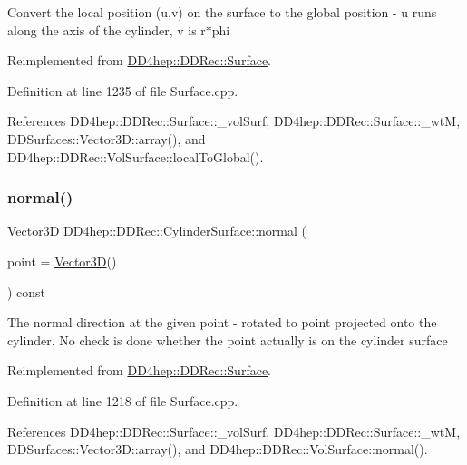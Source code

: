 Convert the local position (u,v) on the surface to the global position -\/ u runs along the axis of the cylinder, v is r$\ast$phi 

Reimplemented from \hyperlink{class_d_d4hep_1_1_d_d_rec_1_1_surface_a766587a97ca4b6c7ef4d2f72b967379c}{D\+D4hep\+::\+D\+D\+Rec\+::\+Surface}.



Definition at line 1235 of file Surface.\+cpp.



References D\+D4hep\+::\+D\+D\+Rec\+::\+Surface\+::\+\_\+vol\+Surf, D\+D4hep\+::\+D\+D\+Rec\+::\+Surface\+::\+\_\+wtM, D\+D\+Surfaces\+::\+Vector3\+D\+::array(), and D\+D4hep\+::\+D\+D\+Rec\+::\+Vol\+Surface\+::local\+To\+Global().

\hypertarget{class_d_d4hep_1_1_d_d_rec_1_1_cylinder_surface_aa995b70c3bfeaa1a21c61b917e4507c5}{}\label{class_d_d4hep_1_1_d_d_rec_1_1_cylinder_surface_aa995b70c3bfeaa1a21c61b917e4507c5} 
\subsubsection{\texorpdfstring{normal()}{normal()}}
{\footnotesize\ttfamily \hyperlink{class_d_d_surfaces_1_1_vector3_d}{Vector3D} D\+D4hep\+::\+D\+D\+Rec\+::\+Cylinder\+Surface\+::normal (\begin{DoxyParamCaption}\item[{const \hyperlink{class_d_d_surfaces_1_1_vector3_d}{Vector3D} \&}]{point = {\ttfamily \hyperlink{class_d_d_surfaces_1_1_vector3_d}{Vector3D}()} }\end{DoxyParamCaption}) const\hspace{0.3cm}{\ttfamily [virtual]}}

The normal direction at the given point -\/ rotated to point projected onto the cylinder. No check is done whether the point actually is on the cylinder surface 

Reimplemented from \hyperlink{class_d_d4hep_1_1_d_d_rec_1_1_surface_a39933172300e705018ff3b3a0de450a3}{D\+D4hep\+::\+D\+D\+Rec\+::\+Surface}.



Definition at line 1218 of file Surface.\+cpp.



References D\+D4hep\+::\+D\+D\+Rec\+::\+Surface\+::\+\_\+vol\+Surf, D\+D4hep\+::\+D\+D\+Rec\+::\+Surface\+::\+\_\+wtM, D\+D\+Surfaces\+::\+Vector3\+D\+::array(), and D\+D4hep\+::\+D\+D\+Rec\+::\+Vol\+Surface\+::normal().

